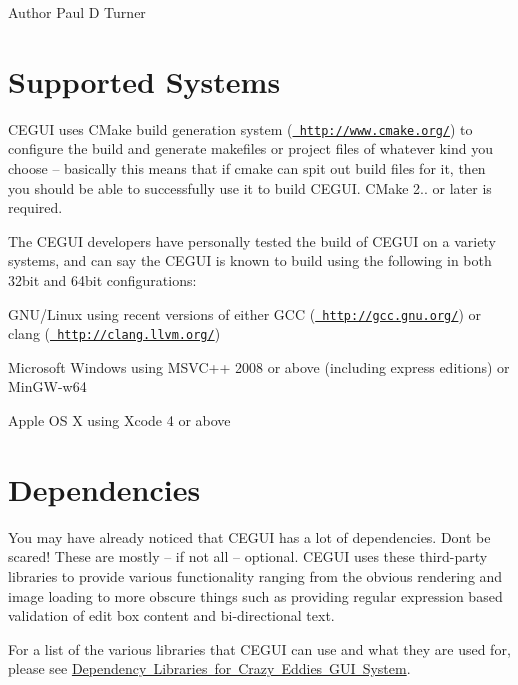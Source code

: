 \begin{DoxyAuthor}{Author}
Paul D Turner
\end{DoxyAuthor}
\hypertarget{compiling_compiling_supportedsystems}{}\section{Supported Systems}\label{compiling_compiling_supportedsystems}
C\+E\+G\+UI uses C\+Make build generation system (\href{http://www.cmake.org/}{\texttt{ http\+://www.\+cmake.\+org/}}) to configure the build and generate makefiles or project files of whatever kind you choose – basically this means that if cmake can spit out build files for it, then you should be able to successfully use it to build C\+E\+G\+UI. C\+Make 2.. or later is required.

The C\+E\+G\+UI developers have personally tested the build of C\+E\+G\+UI on a variety systems, and can say the C\+E\+G\+UI is known to build using the following in both 32bit and 64bit configurations\+:
\begin{DoxyItemize}
\item G\+N\+U/\+Linux using recent versions of either G\+CC (\href{http://gcc.gnu.org/}{\texttt{ http\+://gcc.\+gnu.\+org/}}) or clang (\href{http://clang.llvm.org/}{\texttt{ http\+://clang.\+llvm.\+org/}})
\item Microsoft Windows using M\+S\+V\+C++ 2008 or above (including express editions) or Min\+G\+W-\/w64
\item Apple OS X using Xcode 4 or above
\end{DoxyItemize}\hypertarget{compiling_compiling_dependencies}{}\section{Dependencies}\label{compiling_compiling_dependencies}
You may have already noticed that C\+E\+G\+UI has a lot of dependencies. Don\textquotesingle{}t be scared! These are mostly – if not all – optional. C\+E\+G\+UI uses these third-\/party libraries to provide various functionality ranging from the obvious rendering and image loading to more obscure things such as providing regular expression based validation of edit box content and bi-\/directional text.

For a list of the various libraries that C\+E\+G\+UI can use and what they are used for, please see \mbox{\hyperlink{dependencies}{Dependency Libraries for Crazy Eddie\textquotesingle{}s G\+UI System}}.

